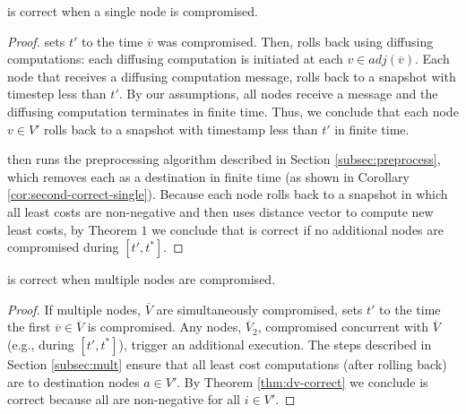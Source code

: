 \begin{corollary}
\label{cor:cpr-correct-single}
\cpr is correct when a single node is compromised.
\end{corollary}
\begin{proof}
\cpr sets $t'$ to the time $\overline{v}$ was compromised. Then, \cpr rolls back using diffusing computations: each diffusing computation is initiated at each $v \in adj(\overline{v})$.
Each node that receives a diffusing computation message, rolls back to a snapshot with timestep less than $t'$.
By our assumptions, all nodes receive a message and the diffusing computation terminates in finite time.  Thus, we conclude
that each node $v \in V'$ rolls back to a snapshot with timestamp less than $t'$ in finite time.

\cpr then runs the preprocessing algorithm described in Section \ref{subsec:preprocess}, which removes each \bad as a destination in finite time (as shown
in Corollary \ref{cor:second-correct-single}). Because each node rolls back to a snapshot in which all least costs are non-negative and 
\cpr then uses distance vector to compute new least costs, by Theorem $1$ we conclude that \cpr is correct if no additional nodes are compromised during  $[t',t^*]$.
\end{proof}

\begin{corollary}
\label{cor:cpr-correct-mult}
\cpr is correct when multiple nodes are compromised.
\end{corollary}
\begin{proof}
If multiple nodes, $\overline{V}$ are simultaneously compromised, \cpr sets $t'$ to the time the first $\overline{v} \in \overline{V}$ is compromised.  Any nodes, $\overline{V}_2$, compromised
concurrent with $\overline{V}$ (e.g., during  $[t',t^*]$), trigger an additional \cpr execution.  The steps described in Section \ref{subsec:mult} ensure 
that all least cost computations (after rolling back) are to
destination nodes $a \in V'$.  By Theorem \ref{thm:dv-correct} we conclude \cpr is correct because all \dmatrixi are non-negative for all $i \in V'$.
\end{proof}








